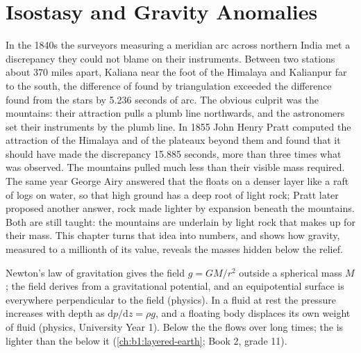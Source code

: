 \chapter{Isostasy and Gravity Anomalies}\label{ch:b1:isostasy-gravity}

In the 1840s the surveyors measuring a meridian arc across northern India met a
discrepancy they could not blame on their instruments. Between two stations
about 370 miles apart, Kaliana near the foot of the Himalaya and Kalianpur far
to the south, the difference of  found by triangulation exceeded the
difference found from the stars by 5.236 seconds of arc. The obvious culprit
was the mountains: their attraction pulls a plumb line northwards, and the
astronomers set their instruments by the plumb line. In 1855 John Henry Pratt
computed the attraction of the Himalaya and of the plateaux beyond them and
found that it should have made the discrepancy 15.885 seconds, more than three
times what was observed. The mountains pulled much less than their visible mass
required. The same year George Airy answered that the  floats on a denser
layer like a raft of logs on water, so that high ground has a deep root of
light rock; Pratt later proposed another answer, rock made lighter by
expansion beneath the mountains. Both are still taught: the mountains are
underlain by light rock that makes up for their mass. This chapter turns that
idea into
numbers, and shows how gravity, measured to a millionth of its value, reveals
the masses hidden below the relief.

\begin{recall}
Newton's law of gravitation gives the field $g = GM/r^2$ outside a spherical
mass $M$; the field derives from a gravitational potential, and an equipotential
surface is everywhere perpendicular to the field (physics). In a fluid at rest
the pressure increases with depth as $\mathrm dp/\mathrm dz = \rho g$, and a
floating body displaces its own weight of fluid (physics, University Year 1).
Below the  the  flows over long times; the  is
lighter than the  below it (\cref{ch:b1:layered-earth}; Book 2, grade 11).
\end{recall}

